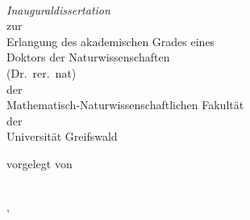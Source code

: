 \begin{titlepage}
    \begin{center}
        \huge\textbf{}\\
        \vspace{0.8cm}
        {\huge\itshape Inauguraldissertation}\\
        \vspace{0.8cm}
        {\Large zur\\
        \vspace{0.25cm}
        Erlangung des akademischen Grades eines\\
        Doktors der Naturwissenschaften\\
        (Dr.\ rer.\ nat)\\
        \vspace{0.25cm}
        der\\
        \vspace{0.25cm}
        Mathematisch-Naturwissenschaftlichen Fakultät\\
        \vspace{0.25cm}
        der\\
        \vspace{0.25cm}
        Universität Greifswald\\
        }
        \vspace{1cm}
    \end{center}
    \vspace*{\fill}%

    \begin{minipage}[]{0.6\linewidth}
        \hfill\vspace{0.1cm}
    \end{minipage}
    \begin{minipage}[]{0.375\linewidth}
        \begin{flushleft}
            vorgelegt von \\
            \\%
        \end{flushleft}
    \end{minipage}
    \vspace{0.5cm}%

    \begin{center}
        , 
    \end{center}%
    \newpage%


\end{titlepage}
